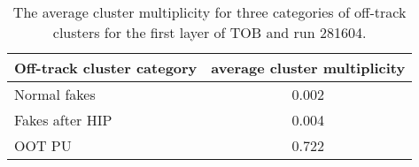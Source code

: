 \begin{table}[h]
\begin{center}
\begin{tabular}{|l|c|}
\hline
Off-track cluster category & average cluster multiplicity \\
\hline
Normal fakes & 0.002  \\
Fakes after HIP & 0.004  \\
OOT PU & 0.722 \\
\hline
\end{tabular}
\caption[Table caption text]{The average cluster multiplicity for three categories of off-track clusters for the first layer of TOB and run 281604. }
\label{tab:multFake}
\end{center}
\end{table}





